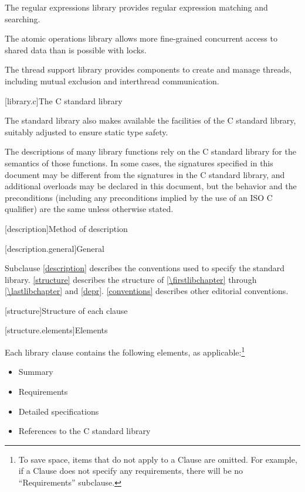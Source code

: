 \pnum
The regular expressions library provides regular expression matching and searching.

\pnum
The atomic operations library allows more fine-grained
concurrent access to shared data than is possible with locks.

\pnum
The thread support library provides components to create
and manage threads, including mutual exclusion and interthread communication.

[library.c]{The C standard library}

\pnum
The \Cpp{} standard library also makes available the facilities of the C standard library,
%
suitably adjusted to ensure static type safety.

\pnum
The descriptions of many library functions rely on the C standard library for
the semantics of those functions.
In some cases,
the signatures specified in this document
may be different from the signatures in the C standard library,
and additional overloads may be declared in this document,
but the behavior and the preconditions
(including any preconditions implied by the use of an
ISO C  qualifier)
are the same unless otherwise stated.

[description]{Method of description}

[description.general]{General}

\pnum
Subclause \ref{description} describes the conventions used to specify the \Cpp{} standard
library. \ref{structure} describes the structure of
\ref{\firstlibchapter} through \ref{\lastlibchapter} and
\ref{depr}. \ref{conventions} describes other editorial conventions.

[structure]{Structure of each clause}

[structure.elements]{Elements}

\pnum
Each library clause contains the following elements, as applicable:\footnote{To
save space, items that do not apply to a Clause are omitted.
For example, if a Clause does not specify any requirements,
there will be no ``Requirements'' subclause.}

\begin{itemize}
\item Summary
\item Requirements
\item Detailed specifications
\item References to the C standard library
\end{itemize}

